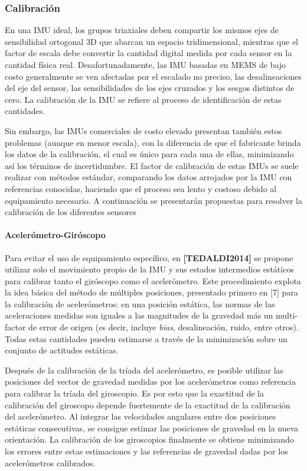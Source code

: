 \subsubsection{Calibración}
En una IMU ideal, los grupos triaxiales deben compartir los mismos ejes de sensibilidad ortogonal 3D que abarcan un espacio tridimensional, mientras que el factor de escala debe convertir la cantidad digital medida por cada sensor en la cantidad física real. Desafortunadamente, las IMU basadas en MEMS de bajo costo generalmente se ven afectadas por el escalado no preciso, las desalineaciones del eje del sensor, las sensibilidades de los ejes cruzados y los sesgos distintos de cero. La calibración de la IMU se refiere al proceso de identificación de estas cantidades.

Sin embargo, las IMUs comerciales de costo elevado presentan también estos problemas (aunque en menor escala), con la diferencia de que el fabricante brinda los datos de la calibración, el cual es único para cada una de ellas, minimizando así los términos de incertidumbre. El factor de calibración de estas IMUs se suele realizar con métodos estándar, comparando los datos arrojados por la IMU con referencias conocidas, haciendo que el proceso sea lento y costoso debido al equipamiento necesario. A continuación se presentarán propuestas para resolver la calibración de los diferentes sensores

\paragraph{Acelerómetro-Giróscopo}
Para evitar el uso de equipamiento específico, en \textbf{[TEDALDI2014]} se propone utilizar solo el movimiento propio de la IMU y sus estados intermedios estáticos para calibrar tanto el giróscopo como el acelerómetro. Este procedimiento explota la idea básica del método de múltiples posiciones, presentado primero en [7] para la calibración de acelerómetros: en una posición estática, las normas de las aceleraciones medidas son iguales a las magnitudes de la gravedad más un multi-factor de error de origen (es decir, incluye \textit{bias}, desalineación, ruido, entre otros). Todas estas cantidades pueden estimarse a través de la minimización sobre un conjunto de actitudes estáticas. 

Después de la calibración de la tríada del acelerómetro, es posible utilizar las posiciones del vector de gravedad medidas por los acelerómetros como referencia para calibrar la tríada del giroscopio. Es por esto que la exactitud de la calibración del giroscopo depende fuertemente de la exactitud de la calibración del acelerómetro. Al integrar las velocidades angulares entre dos posiciones estáticas consecutivas, se consigue estimar las posiciones de gravedad en la nueva orientación. La calibración de los giroscopios finalmente se obtiene minimizando los errores entre estas estimaciones y las referencias de gravedad dadas por los acelerómetros calibrados.

